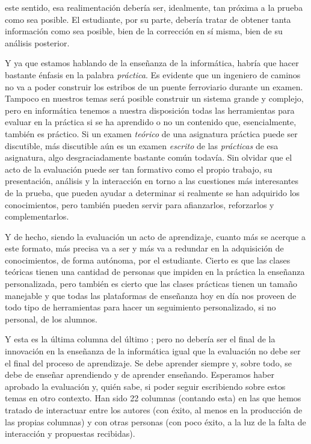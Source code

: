 \documentclass[twoside,10pt]{article}
\begin{document}
\begin{multicols}{2}
\noindent este sentido, esa realimentación debería ser, idealmente,
tan próxima a la prueba como sea posible.  El estudiante, por su
parte, debería tratar de obtener tanta información como sea posible,
bien de la corrección en sí misma, bien de su análisis posterior.

Y ya que estamos hablando de la enseñanza de la informática, habría
que hacer bastante énfasis en la palabra {\em práctica}.  Es evidente
que un ingeniero de caminos no va a poder construir los estribos de un
puente ferroviario durante un examen.  Tampoco en nuestros temas será
posible construir un sistema grande y complejo, pero en informática
tenemos a nuestra disposición todas las herramientas para evaluar en
la práctica si se ha aprendido o no un contenido que, esencialmente,
también es práctico.  Si un examen {\em teórico} de una asignatura
práctica puede ser discutible, más discutible aún es un examen {\em
escrito} de las {\em prácticas} de esa asignatura, algo
desgraciadamente bastante común todavía.  Sin olvidar que el acto de
la evaluación puede ser tan formativo como el propio trabajo, su
presentación, análisis y la interacción en torno a las cuestiones más
interesantes de la prueba, que pueden ayudar a determinar si realmente
se han adquirido los conocimientos, pero también pueden servir para
afianzarlos, reforzarlos y complementarlos.

Y de hecho, siendo la evaluación un acto de aprendizaje, cuanto más se
acerque a este formato, más precisa va a ser y más va a redundar en la
adquisición de conocimientos, de forma autónoma, por el
estudiante. Cierto es que las clases teóricas tienen una cantidad de
personas que impiden en la práctica la enseñanza personalizada, pero
también es cierto que las clases prácticas tienen un tamaño manejable
y que todas las plataformas de enseñanza hoy en día nos proveen de
todo tipo de herramientas para hacer un seguimiento personalizado, si
no personal, de los alumnos. 

Y esta es la última columna del último \ReVision; pero no debería ser
el final de la innovación en la enseñanza de la informática igual que
la evaluación no debe ser el final del proceso de aprendizaje.  Se
debe aprender siempre y, sobre todo, se debe de enseñar aprendiendo y
de aprender enseñando.  Esperamos haber aprobado la evaluación y,
quién sabe, si poder seguir escribiendo sobre estos temas en otro
contexto.  Han sido 22 columnas (contando esta) en las que hemos
tratado de interactuar entre los autores (con éxito, al menos en la
producción de las propias columnas) y con otras personas (con poco
éxito, a la luz de la falta de interacción y propuestas recibidas).


\end{multicols}
\end{document}

